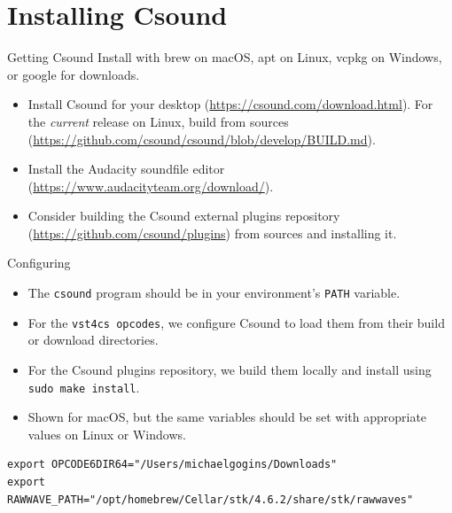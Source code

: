 \documentclass{beamer}
\begin{document}
\section{Installing Csound}
\begin{frame}{Getting Csound}
Install with brew on macOS, apt on Linux, vcpkg on Windows, or 
google for downloads.
\begin{itemize}
\item Install Csound for your desktop (\url{https://csound.com/download.html}). For the \emph{current} release on
Linux, build from sources
(\url{https://github.com/csound/csound/blob/develop/BUILD.md}).
\item Install the Audacity soundfile editor (\url{https://www.audacityteam.org/download/}).
\item Consider building the Csound external plugins repository (\url{https://github.com/csound/plugins}) from sources and installing it.
\end{itemize}
\end{frame}

\begin{frame}{Configuring}
\begin{itemize}
\item The \texttt{csound} program should be in your environment's \texttt{PATH} variable.
\item For the \texttt{vst4cs opcodes}, we configure Csound to load them from their build or download directories.
\item For the Csound plugins repository, we build them locally and install using \texttt{sudo make install}.
\item Shown for macOS, but the same variables should be set with appropriate values on Linux or Windows.
\end{itemize}
\end{frame}

\begin{lstlisting}
export OPCODE6DIR64="/Users/michaelgogins/Downloads"
export RAWWAVE_PATH="/opt/homebrew/Cellar/stk/4.6.2/share/stk/rawwaves"
\end{lstlisting}
\end{document}
